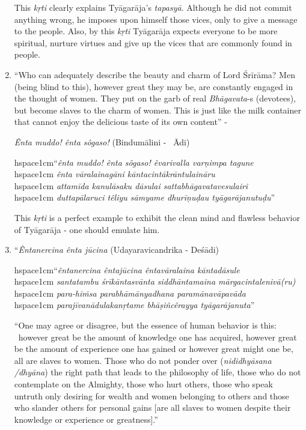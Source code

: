 \begin{enumerate}
 This \textit{kṛti} clearly explains Tyāgarāja’s \textit{tapasyā}. Although he did not commit anything wrong, he imposes upon himself those vices, only to give a message to the people. Also, by this \textit{kṛti} Tyāgarāja expects everyone to be more spiritual, nurture virtues and give up the vices that are commonly found in people.

 \item 
 “Who can adequately describe the beauty and charm of Lord Śrīrāma? Men (being blind to this), however great they may be, are constantly engaged in the thought of women. They put on the garb of real \textit{Bhāgavata}-s (devotees), but become slaves to the charm of women. This is just like the milk container that cannot enjoy the delicious taste of its own content” -

 \textit{Ênta muddo! ênta sôgaso!} (Bindumālini -  Ādi)

\begin{myquote}
hspace{1cm}“\textit{ênta muddo! ênta sôgaso! êvarivalla varṇimpa tagune}\\hspace{1cm} \textit{ênta vāralainagāni kāntacintākrāntulaināru}\\hspace{1cm} \textit{attamīda kanulāsaku dāsulai sattabhāgavatavesulairi}\\hspace{1cm} \textit{duttapālaruci têliyu sāmyame dhurīṇuḍau tyāgarājanutuḍu}”
\end{myquote}

 This \textit{kṛti} is a perfect example to exhibit the clean mind and flawless behavior of Tyāgarāja - one should emulate him.

 \item 
 “\textit{Êntanercina ênta jūcina} (Udayaravicandrika - Deśādi)

\begin{myquote}
hspace{1cm}“\textit{êntanercina êntajūcina êntavāralaina kāntadāsule}\\hspace{1cm} \textit{santatambu śrīkāntasvānta siddhāntamaina mārgacintalenivā(ru)}\\hspace{1cm} \textit{para-hiṁsa parabhāmānyadhana paramānavāpavāda} \\hspace{1cm} \textit{parajīvanādulakanṛtame bhāṣiñcêrayya tyāgarājanuta}”
\end{myquote}

 “One may agree or disagree, but the essence of human behavior is this:  however great be the amount of knowledge one has acquired, however great be the amount of experience one has gained or however great might one be, all are slaves to women. Those who do not ponder over (\textit{nididhyāsana /dhyāna}) the right path that leads to the philosophy of life, those who do not contemplate on the Almighty, those who hurt others, those who speak untruth only desiring for wealth and women belonging to others and those who slander others for personal gains [are all slaves to women despite their knowledge or experience or greatness].”


\end{enumerate}
